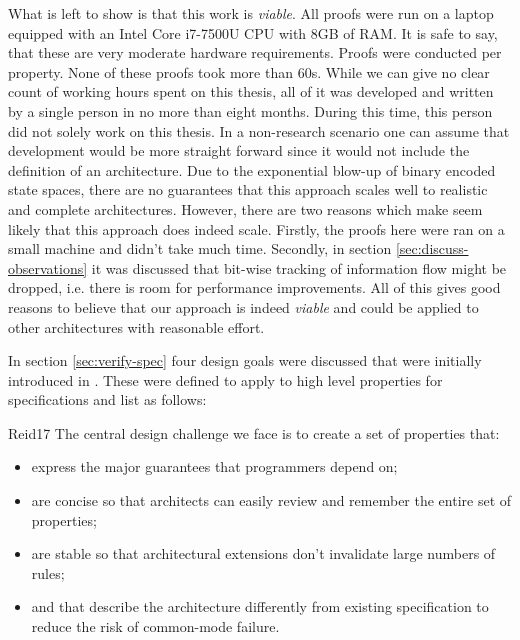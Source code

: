 What is left to show is that this work is \textit{viable}.
All proofs were run on a laptop equipped with an Intel Core i7-7500U CPU with 8GB of RAM.
It is safe to say, that these are very moderate hardware requirements.
Proofs were conducted per property.
None of these proofs took more than 60s.
While we can give no clear count of working hours spent on this thesis, all of it was developed and written by a single person in no more than eight months.
During this time, this person did not solely work on this thesis.
In a non-research scenario one can assume that development would be more straight forward since it would not include the definition of an architecture.
Due to the exponential blow-up of binary encoded state spaces, there are no guarantees that this approach scales well to realistic and complete architectures.
However, there are two reasons which make seem likely that this approach does indeed scale.
Firstly, the proofs here were ran on a small machine and didn't take much time.
Secondly, in section \ref{sec:discuss-observations} it was discussed that bit-wise tracking of information flow might be dropped, i.e. there is room for performance improvements.
All of this gives good reasons to believe that our approach is indeed \textit{viable} and could be applied to other architectures with reasonable effort.


In section \ref{sec:verify-spec} four design goals were discussed that were initially introduced in \cite{Reid17}.
These were defined to apply to high level properties for specifications and list as follows:
\begin{displaycquote}[pp.88:2-3]{Reid17}
    The central design challenge we face is to create a set of properties that:
    \begin{itemize}
        \item express the major guarantees that programmers depend on;
        \item are concise so that architects can easily review and remember the entire set of properties;
        \item are stable so that architectural extensions don't invalidate large numbers of rules;
        \item and that describe the architecture differently from existing specification to reduce the risk of common-mode failure.
    \end{itemize}
\end{displaycquote}

